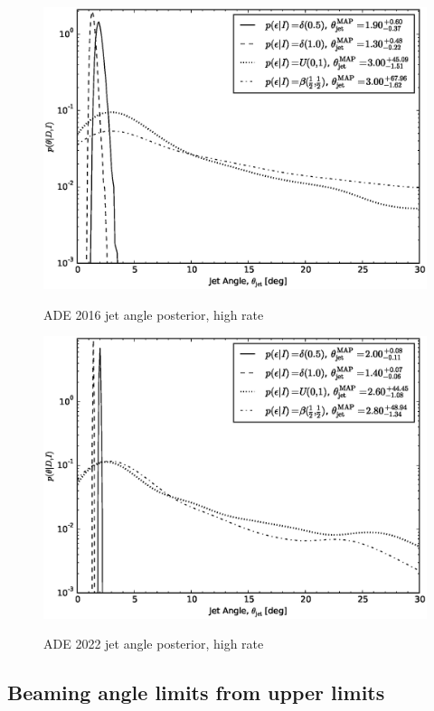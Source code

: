 \documentclass[twocolumn,nofootinbib]{revtex4-1}
\begin{document}
\begin{figure}
\centering
{\includegraphics[width=\linewidth]{jet_angle_posterior_aligo_2016_high_real.eps}}
\caption{ADE 2016 jet angle posterior, high rate}
\end{figure}

\begin{figure}
\centering
{\includegraphics[width=\linewidth]{jet_angle_posterior_aligo_2022_high_real.eps}}
\caption{ADE 2022 jet angle posterior, high rate}
\end{figure}

\subsection{Beaming angle limits from upper limits}
\label{sec:beaming_limits}
\end{document}

